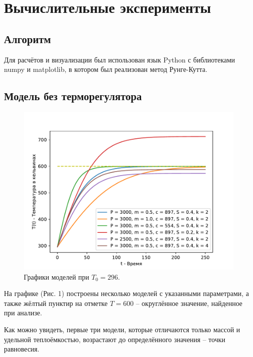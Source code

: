 \section{Вычислительные эксперименты}
    \subsection{Алгоритм}
        Для расчётов и визуализации был использован язык Python с библиотеками numpy и matplotlib, в котором был реализован метод Рунге-Кутта.

        

    \subsection{Модель без терморегулятора}
        \begin{figure}[H]
            \centering
            \includegraphics[width=17cm]{pictures/utug1.pdf}
            \caption{Графики моделей при $T_0 = 296$.}
        \end{figure}

        На графике (Рис. 1) построены несколько моделей с указанными параметрами, а также жёлтый пунктир на отметке $T = 600$ -- округлённое значение, найденное при анализе.
        
        Как можно увидеть, первые три модели, которые отличаются только массой и удельной теплоёмкостью, возрастают до определённого значения -- точки равновесия. 
        
